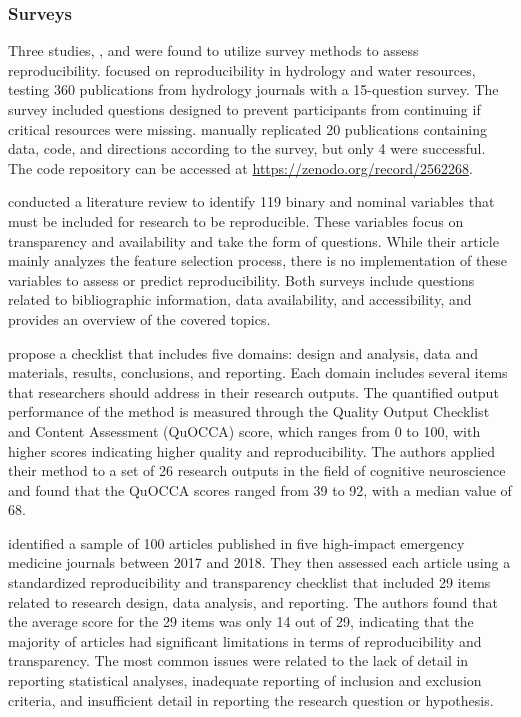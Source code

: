 \documentclass[12pt, a4paper, twocolumn]{article}
\begin{document}
	\subsubsection{Surveys}
	Three studies,  \citet{stagge2019assessing},  \citet{mcintosh2017repeat} and \citet{QualityOutputChecklist} were found to utilize survey methods to assess reproducibility. \citet{stagge2019assessing} focused on reproducibility in hydrology and water resources, testing 360 publications from hydrology journals with a 15-question survey. The survey included questions designed to prevent participants from continuing if critical resources were missing. \citet{stagge2019assessing} manually replicated 20 publications containing data, code, and directions according to the survey, but only 4 were successful. The code repository can be accessed at \url{https://zenodo.org/record/2562268}.
	
	\citet{mcintosh2017repeat} conducted a literature review to identify 119 binary and nominal variables that must be included for research to be reproducible. These variables focus on transparency and availability and take the form of questions. While their article mainly analyzes the feature selection process, there is no implementation of these variables to assess or predict reproducibility. Both surveys include questions related to bibliographic information, data availability, and accessibility, and  provides an overview of the covered topics.
	
	\citet{QualityOutputChecklist} propose a checklist that includes five domains: design and analysis, data and materials, results, conclusions, and reporting. Each domain includes several items that researchers should address in their research outputs. The quantified output performance of the method is measured through the Quality Output Checklist and Content Assessment (QuOCCA) score, which ranges from 0 to 100, with higher scores indicating higher quality and reproducibility. The authors applied their method to a set of 26 research outputs in the field of cognitive neuroscience and found that the QuOCCA scores ranged from 39 to 92, with a median value of 68.

	\citet{Johnson2021Evaluating} identified a sample of 100 articles published in five high-impact emergency medicine journals between 2017 and 2018. They then assessed each article using a standardized reproducibility and transparency checklist that included 29 items related to research design, data analysis, and reporting. The authors found that the average score for the 29 items was only 14 out of 29, indicating that the majority of articles had significant limitations in terms of reproducibility and transparency. The most common issues were related to the lack of detail in reporting statistical analyses, inadequate reporting of inclusion and exclusion criteria, and insufficient detail in reporting the research question or hypothesis.
\end{document}
